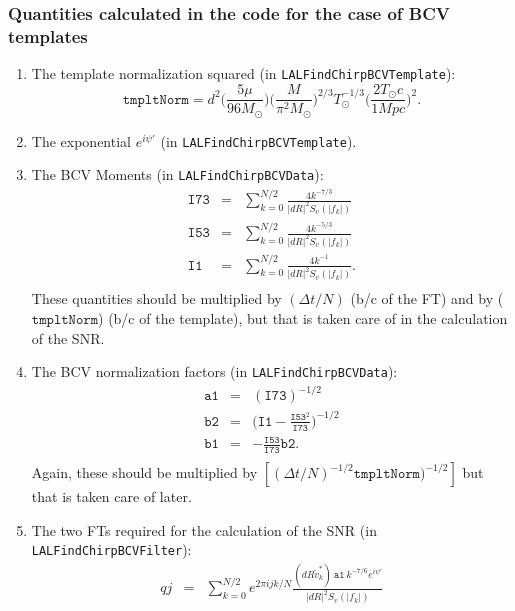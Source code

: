 \subsubsection*{Quantities calculated in the code for the case of BCV templates}

\begin{enumerate}
\item The template normalization squared (in \texttt{LALFindChirpBCVTemplate}):
\begin{equation}
\mathtt{tmpltNorm} = d^2 \Big ( \frac{5\mu}{96 M_{\odot}}\Big ) \Big ( \frac{M}        {\pi^2 M_{\odot}} \Big )^{2/3} T_{\odot}^{-1/3}  
        \Big (\frac{2 T_{\odot} c}{1 Mpc} \Big )^2.
\end{equation}
\item The exponential $e^{i \psi'}$ (in \texttt{LALFindChirpBCVTemplate}).
\item The BCV Moments (in \texttt{LALFindChirpBCVData}): \\
\begin{eqnarray}
\mathtt{I73} &=& \sum_{k=0}^{N/2} \frac{4 k^{-7/3}}{|dR|^2 S_v(|f_k|)} \\
\mathtt{I53} &=& \sum_{k=0}^{N/2} \frac{4 k^{-5/3}}{|dR|^2 S_v(|f_k|)} \\
\mathtt{I1} &=& \sum_{k=0}^{N/2} \frac{4 k^{-1}}{|dR|^2 S_v(|f_k|)}. \\
\end{eqnarray}
These quantities should be multiplied by $(\Delta t /N)$ (b/c of the FT) and
by ($\mathtt{tmpltNorm}$) (b/c of the template), but that is taken
care of in the calculation of the SNR.
\item The BCV normalization factors (in \texttt{LALFindChirpBCVData}):
\begin{eqnarray}
\mathtt{a1} &=& (\mathtt{I73})^{-1/2} \\
\mathtt{b2} &=& \Big( \mathtt{I1} - \frac{\mathtt{I53}^2}{\mathtt{I73}}
	\Big )^{-1/2} \\
\mathtt{b1} &=& -\frac{\mathtt{I53}}{\mathtt{I73}}  \mathtt{b2}. \\
\end{eqnarray}
Again, these should be multiplied by $[(\Delta t/N)^{-1/2} \mathtt{tmpltNorm}
)^{-1/2}]$ 
but that is taken care of later.
\item The two FTs required for the calculation of the SNR (in 
	\texttt{LALFindChirpBCVFilter}):
\begin{eqnarray}
qj &=&\sum_{k=0}^{N/2}e^{2 \pi i j k/N} \frac{(dR \tilde{v}_k^{\ast}) 
	\: \mathtt{a1} \: k^{-7/6} e^{i \psi'} }{ |dR|^2 S_v(|f_k|) } \\

\end{eqnarray}
\end{enumerate}
